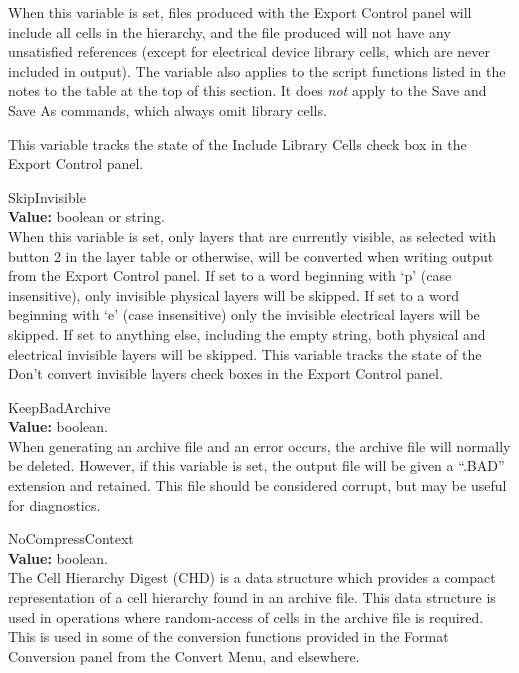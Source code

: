 \begin{description}
When this variable is set, files produced with the {\cb Export
Control} panel will include all cells in the hierarchy, and the file
produced will not have any unsatisfied references (except for
electrical device library cells, which are never included in output). 
The variable also applies to the script functions listed in the notes
to the table at the top of this section.  It does {\it not} apply to
the {\cb Save} and {\cb Save As} commands, which always omit library
cells.

This variable tracks the state of the {\cb Include Library Cells}
check box in the {\cb Export Control} panel.

\item{\et SkipInvisible}\\
{\bf Value:} boolean or string.\\
When this variable is set, only layers that are currently visible, as
selected with button 2 in the layer table or otherwise, will be
converted when writing output from the {\cb Export Control} panel.  If
set to a word beginning with `{\vt p}' (case insensitive), only
invisible physical layers will be skipped.  If set to a word beginning
with `{\vt e}' (case insensitive) only the invisible electrical layers
will be skipped.  If set to anything else, including the empty string,
both physical and electrical invisible layers will be skipped.  This
variable tracks the state of the {\cb Don't convert invisible layers}
check boxes in the {\cb Export Control} panel.

\item{\et KeepBadArchive}\\
{\bf Value:} boolean.\\
When generating an archive file and an error occurs, the archive file
will normally be deleted.  However, if this variable is set, the
output file will be given a ``{\vt .BAD}'' extension and retained. 
This file should be considered corrupt, but may be useful for
diagnostics.

\item{\et NoCompressContext}\\
{\bf Value:} boolean.\\
The Cell Hierarchy Digest (CHD) is a data structure which provides a
compact representation of a cell hierarchy found in an archive file. 
This data structure is used in operations where random-access of cells
in the archive file is required.  This is used in some of the
conversion functions provided in the {\cb Format Conversion} panel
from the {\cb Convert Menu}, and elsewhere.


\end{description}

